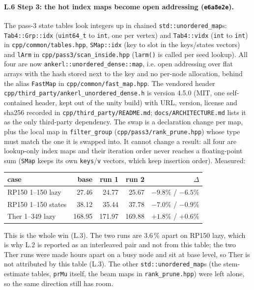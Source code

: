 \documentclass[11pt]{article}
\begin{document}
\paragraph{L.6 Step 3: the hot index maps become open addressing (\texttt{e6a8e2e}).} The pass-3 state tables look integers up in chained \texttt{std::unordered\_map}s: \texttt{Tab4::Grp::idx} (\texttt{uint64\_t} to \texttt{int}, one per vertex) and \texttt{Tab4::vidx} (\texttt{int} to \texttt{int}) in \texttt{cpp/common/tables.hpp}, \texttt{SMap::idx} (key to slot in the keys/states vectors) and \texttt{lArm} in \texttt{cpp/pass3/scan\_inside.hpp} (\texttt{larm()} is called per seed lookup). All four are now \texttt{ankerl::unordered\_dense::map}, i.e. open addressing over flat arrays with the hash stored next to the key and no per-node allocation, behind the alias \texttt{FastMap} in \texttt{cpp/common/fast\_map.hpp}. The vendored header \texttt{cpp/third\_party/ankerl\_unordered\_dense.h} is version 4.5.0 (MIT, one self-contained header, kept out of the unity build) with URL, version, license and sha256 recorded in \texttt{cpp/third\_party/README.md}; \texttt{docs/ARCHITECTURE.md} lists it as the only third-party dependency. The swap is a declaration change per map, plus the local map in \texttt{filter\_group} (\texttt{cpp/pass3/rank\_prune.hpp}) whose type must match the one it is swapped into. It cannot change a result: all four are lookup-only index maps and their iteration order never reaches a floating-point sum (\texttt{SMap} keeps its own \texttt{keys}/\texttt{v} vectors, which keep insertion order). Measured:
\begin{center}
\begin{tabular}{@{}lrrrr@{}}
\toprule
case & base & run 1 & run 2 & $\Delta$ \\
\midrule
RP150 1--150 lazy & 27.46 & 24.77 & 25.67 & $-9.8\%$ / $-6.5\%$ \\
RP150 1--150 states & 38.12 & 35.44 & 37.78 & $-7.0\%$ / $-0.9\%$ \\
Ther 1--349 lazy & 168.95 & 171.97 & 169.88 & $+1.8\%$ / $+0.6\%$ \\
\bottomrule
\end{tabular}
\end{center}
This is the whole win (L.3). The two runs are 3.6\,\% apart on RP150 lazy, which is why L.2 is reported as an interleaved pair and not from this table; the two Ther runs were made hours apart on a busy node and sit at base level, so Ther is not attributed by this table (L.3). The other \texttt{std::unordered\_map}s (the stem-estimate tables, \texttt{prMu} itself, the beam maps in \texttt{rank\_prune.hpp}) were left alone, so the same direction still has room.
\end{document}
